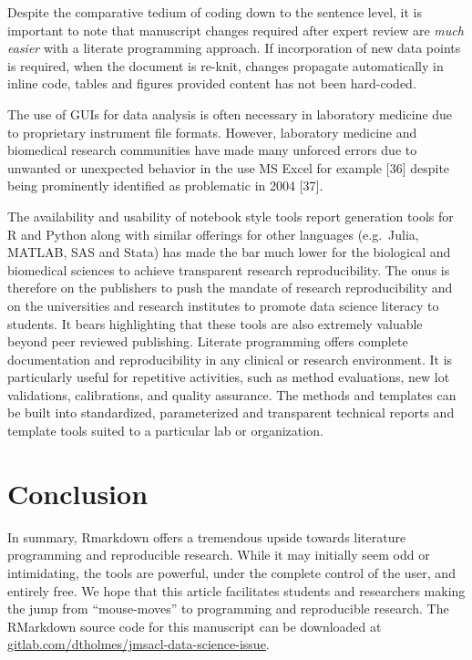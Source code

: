 \documentclass[]{elsarticle} %
\begin{document}
Despite the comparative tedium of coding down to the sentence level, it
is important to note that manuscript changes required after expert
review are \emph{much easier} with a literate programming approach. If
incorporation of new data points is required, when the document is
re-knit, changes propagate automatically in inline code, tables and
figures provided content has not been hard-coded.

The use of GUIs for data analysis is often necessary in laboratory
medicine due to proprietary instrument file formats. However, laboratory
medicine and biomedical research communities have made many unforced
errors due to unwanted or unexpected behavior in the use MS Excel for
example {[}36{]} despite being prominently identified as problematic in
2004 {[}37{]}.

The availability and usability of notebook style tools report generation
tools for R and Python along with similar offerings for other languages
(e.g.~Julia, MATLAB, SAS and Stata) has made the bar much lower for the
biological and biomedical sciences to achieve transparent research
reproducibility. The onus is therefore on the publishers to push the
mandate of research reproducibility and on the universities and research
institutes to promote data science literacy to students. It bears
highlighting that these tools are also extremely valuable beyond peer
reviewed publishing. Literate programming offers complete documentation
and reproducibility in any clinical or research environment. It is
particularly useful for repetitive activities, such as method
evaluations, new lot validations, calibrations, and quality assurance.
The methods and templates can be built into standardized, parameterized
and transparent technical reports and template tools suited to a
particular lab or organization.

\hypertarget{conclusion}{%
\section{Conclusion}\label{conclusion}}

In summary, Rmarkdown offers a tremendous upside towards literature
programming and reproducible research. While it may initially seem odd
or intimidating, the tools are powerful, under the complete control of
the user, and entirely free. We hope that this article facilitates
students and researchers making the jump from ``mouse-moves'' to
programming and reproducible research. The RMarkdown source code for
this manuscript can be downloaded at
\href{https://gitlab.com/dtholmes/jmsacl-data-science-issue}{gitlab.com/dtholmes/jmsacl-data-science-issue}.
\end{document}
